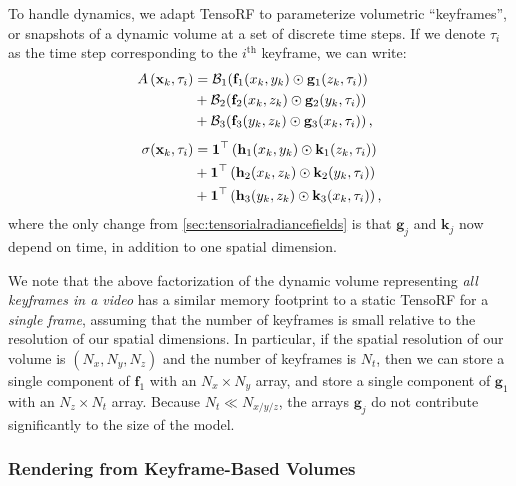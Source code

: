 \documentclass[10pt,twocolumn,letterpaper]{article}
\begin{document}
To handle dynamics, we adapt TensoRF to parameterize volumetric ``keyframes'', or snapshots of a dynamic volume at a set of discrete time steps. 
If we denote $\tau_i$ as the time step corresponding to the $i^\text{th}$ keyframe, we can write:
\begin{align}
    A\left(\mathbf{x}_k, \tau_i\right)
    &= \mathcal{B}_1 \!\left( \mathbf{f}_1(x_k, y_k) \odot \mathbf{g}_1(z_k, \tau_i) \right) \nonumber \\
    &+ \mathcal{B}_2 \!\left( \mathbf{f}_2(x_k, z_k) \odot \mathbf{g}_2(y_k, \tau_i) \right) \label{eqn:tensorappearance} \\
    &+ \mathcal{B}_3 \!\left( \mathbf{f}_3(y_k, z_k) \odot \mathbf{g}_3(x_k, \tau_i) \right) \text{,} \nonumber\\[4pt]
    \sigma(\mathbf{x}_k, \tau_i)
    &= \mathbf{1}^\top \left( \mathbf{h}_1(x_k, y_k) \odot \mathbf{k}_1(z_k, \tau_i) \right) \nonumber \\
    &+ \mathbf{1}^\top \left( \mathbf{h}_2(x_k, z_k) \odot \mathbf{k}_2(y_k, \tau_i) \right) \label{eqn:tensoropacity} \\
    &+ \mathbf{1}^\top \left( \mathbf{h}_3(y_k, z_k) \odot \mathbf{k}_3(x_k, \tau_i) \right) \text{,} \nonumber
\end{align}
where the only change from \cref{sec:tensorialradiancefields} is that $\mathbf{g}_j$ and $\mathbf{k}_j$ now depend on time, in addition to one spatial dimension. 

We note that the above factorization of the dynamic volume representing \textit{all keyframes in a video} has a similar memory footprint to a static TensoRF for a \textit{single frame}, assuming that the number of keyframes is small relative to the resolution of our spatial dimensions.
In particular, if the spatial resolution of our volume is $(N_x, N_y, N_z)$ and the number of keyframes is $N_t$, then we can store a single component of $\mathbf{f}_1$ with an $N_x \times N_y$ array, and store a single component of $\mathbf{g}_1$ with an $N_z \times N_t$ array.
Because $N_t \ll N_{x/y/z}$, the arrays $\mathbf{g}_j$ do not contribute significantly to the size of the model.

\subsubsection{Rendering from Keyframe-Based Volumes}
\label{sec:samplingandrendering}
\end{document}
